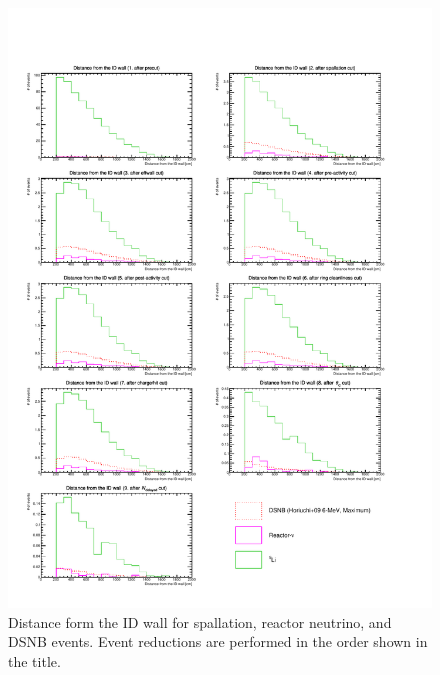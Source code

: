 \begin{figure}[h]
	\centering
	\includegraphics[width=15cm]{PDF/Dist_Nuebar/Che_50deg_tag_ge1/dwall}
	\caption[Distance from the ID wall for spallation, reactor neutrino, and DSNB events]{
	Distance form the ID wall for spallation, reactor neutrino, and DSNB events.
	Event reductions are performed in the order shown in the title.
	}\label{Nuebar_dwall}
\end{figure}

